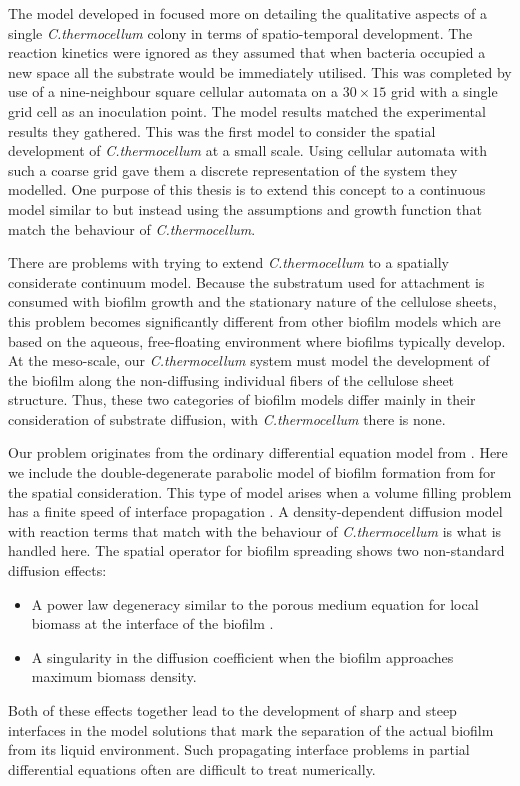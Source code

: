 The model developed in \cite{wang2011spatial} focused more on detailing the qualitative aspects of a single \textit{C.thermocellum} colony in terms of spatio-temporal development.  
The reaction kinetics were ignored as they assumed that when bacteria occupied a new space all the substrate would be immediately utilised.
This was completed by use of a nine-neighbour square cellular automata on a $30 \times 15$ grid with a single grid cell as an inoculation point.
The model results matched the experimental results they gathered.
This was the first model to consider the spatial development of \textit{C.thermocellum} at a small scale.
Using cellular automata with such a coarse grid gave them a discrete representation of the system they modelled.
One purpose of this thesis is to extend this concept to a continuous model similar to \cite{eberl2001deterministic} but instead using the assumptions and growth function that match the behaviour of \textit{C.thermocellum}.

There are problems with trying to extend \textit{C.thermocellum} to a spatially considerate continuum model.
Because the substratum used for attachment is consumed with biofilm growth and the stationary nature of the cellulose sheets, this problem becomes significantly different from other biofilm models which are based on the aqueous, free-floating environment where biofilms typically develop.
At the meso-scale, our \textit{C.thermocellum} system must model the development of the biofilm along the non-diffusing individual fibers of the cellulose sheet structure.
Thus, these two categories of biofilm models differ mainly in their consideration of substrate diffusion, with \textit{C.thermocellum} there is none.

Our problem originates from the ordinary differential equation model from \cite{dumitrache2015mathematicalModeling}.
Here we include the double-degenerate parabolic model of biofilm formation from \cite{eberl2001deterministic} for the spatial consideration.
This type of model arises when a volume filling problem has a finite speed of interface propagation \citep{khassehkhan2009nonlinearMaster}.
A density-dependent diffusion model with reaction terms that match with the behaviour of \textit{C.thermocellum} is what is handled here.
The spatial operator for biofilm spreading shows two non-standard diffusion effects:
\begin{itemize} 
  \item A power law degeneracy similar to the porous medium equation for local biomass at the interface of the biofilm \citep{gurtin1977diffusion}.
  \item A singularity in the diffusion coefficient when the biofilm approaches maximum biomass density. 
\end{itemize}
Both of these effects together lead to the development of sharp and steep interfaces in the model solutions that mark the separation of the actual biofilm from its liquid environment.
Such propagating interface problems in partial differential equations often are difficult to treat numerically.

